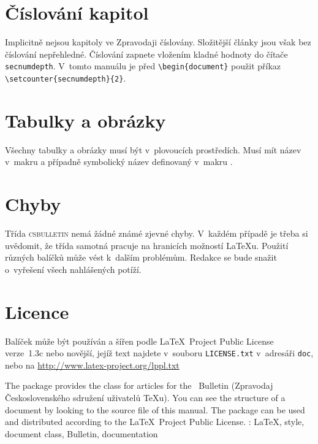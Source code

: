 \documentclass{csbulletin}
\let\pkg\textsc
\begin{document}
\section{Číslování kapitol}
Implicitně nejsou kapitoly ve Zpravodaji číslovány. Složitější články jsou však bez číslování
nepřehledné. Číslování zapnete vložením kladné hodnoty do čítače \texttt{secnumdepth}. V~tomto
manuálu je před \verb;\begin{document}; použit příkaz \verb;\setcounter{secnumdepth}{2};.

\section{Tabulky a obrázky}
Všechny
tabulky a obrázky musí být v~plovoucích prostředích. Musí mít název v~makru  a
případně symbolický název definovaný v~makru .

\section{Chyby}
Třída \pkg{csbulletin} nemá žádné známé zjevné chyby.
V~každém případě je třeba si uvědomit, že třída samotná pracuje na hranicích možností \LaTeX{}u.
Použití různých balíčků může vést k~dalším problémům. Redakce se bude snažit o~vyřešení všech
nahlášených potíží.

\section{Licence}
Balíček může být používán a šířen podle \LaTeX\ Project Public License verze~1.3c nebo novější, jejíž
text najdete v~souboru \texttt{LICENSE.txt} v~adresáři \texttt{doc}, nebo na
\url{http://www.latex-project.org/lppl.txt}

\begin{summary}
The package provides the class for articles for the \cstug\ Bulletin (Zpravodaj Československého
sdružení uživatelů \TeX u). You can see the structure of a document by looking to the source file
of this manual. The package can be used and distributed according to the \LaTeX\ Project Public
License.
  \keywords: \LaTeX, style, document class, \CSTUG{} Bulletin, documentation
\end{summary}
\end{document}
